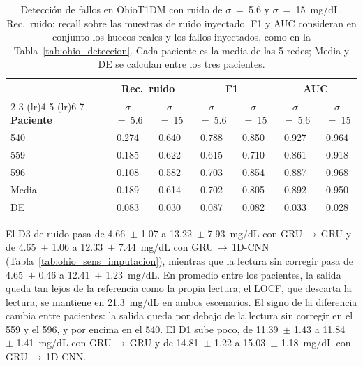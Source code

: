 \documentclass{report}
\begin{document}
\begin{table}[!htb]
\centering
\footnotesize
\setlength{\tabcolsep}{5pt}
\caption{Detección de fallos en OhioT1DM con ruido de $\sigma$~=~5.6 y $\sigma$~=~15~mg/dL. Rec.\ ruido: recall sobre las muestras de ruido inyectado. F1 y AUC consideran en conjunto los huecos reales y los fallos inyectados, como en la Tabla~\ref{tab:ohio_deteccion}. Cada paciente es la media de las 5 redes; Media y DE se calculan entre los tres pacientes.}
\label{tab:ohio_sens_deteccion}
\begin{tabular}{lcccccc}
\toprule
& \multicolumn{2}{c}{\textbf{Rec.\ ruido}} & \multicolumn{2}{c}{\textbf{F1}} & \multicolumn{2}{c}{\textbf{AUC}} \\
\cmidrule(lr){2-3} \cmidrule(lr){4-5} \cmidrule(lr){6-7}
\textbf{Paciente} & $\sigma$~=~5.6 & $\sigma$~=~15 & $\sigma$~=~5.6 & $\sigma$~=~15 & $\sigma$~=~5.6 & $\sigma$~=~15 \\
\midrule
540 & 0.274 & 0.640 & 0.788 & 0.850 & 0.927 & 0.964 \\
559 & 0.185 & 0.622 & 0.615 & 0.710 & 0.861 & 0.918 \\
596 & 0.108 & 0.582 & 0.703 & 0.854 & 0.887 & 0.968 \\
\midrule
Media & 0.189 & 0.614 & 0.702 & 0.805 & 0.892 & 0.950 \\
DE & 0.083 & 0.030 & 0.087 & 0.082 & 0.033 & 0.028 \\
\bottomrule
\end{tabular}
\end{table}
 
El D3 de ruido pasa de 4.66~$\pm$ 1.07 a 13.22~$\pm$ 7.93~mg/dL con GRU\,$\rightarrow$\,GRU y de 4.65~$\pm$ 1.06 a 12.33~$\pm$ 7.44~mg/dL con GRU\,$\rightarrow$\,1D-CNN (Tabla~\ref{tab:ohio_sens_imputacion}), mientras que la lectura sin corregir pasa de 4.65~$\pm$ 0.46 a 12.41~$\pm$ 1.23~mg/dL. En promedio entre los pacientes, la salida queda tan lejos de la referencia como la propia lectura; el LOCF, que descarta la lectura, se mantiene en 21.3~mg/dL en ambos escenarios. El signo de la diferencia cambia entre pacientes: la salida queda por debajo de la lectura sin corregir en el 559 y el 596, y por encima en el 540. El D1 sube poco, de 11.39~$\pm$ 1.43 a 11.84~$\pm$ 1.41~mg/dL con GRU\,$\rightarrow$\,GRU y de 14.81~$\pm$ 1.22 a 15.03~$\pm$ 1.18~mg/dL con GRU\,$\rightarrow$\,1D-CNN.
 
\end{document}
